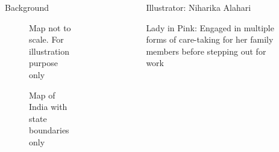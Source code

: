 \documentclass[final]{beamer}
\newlength{\sepwidth}
\newlength{\colwidth}
\newcommand{\separatorcolumn}{\begin{column}{\sepwidth}\end{column}}
\begin{document}
\begin{frame}[t]
\begin{columns}[t]
\begin{column}{\colwidth}
\begin{block}{Background}
\begin{figure}
%
                {Map not to scale. For illustration purpose only}
\caption{Map of India with state boundaries only}
\end{figure}
  \end{block}
\end{column}

\separatorcolumn

\begin{column}{\colwidth}

\begin{figure}
%
                  {Illustrator: Niharika Alahari}
      \vspace{-1.2cm}  
\caption{Lady in Pink: Engaged in multiple forms of care-taking for her family members
before stepping out for work}
\end{figure}


\end{column}
\end{columns}
\end{frame}
\end{document}
